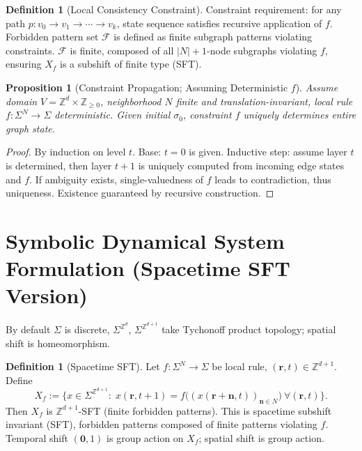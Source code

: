 \documentclass[11pt]{article}
\newtheorem{proposition}[theorem]{Proposition}
\theoremstyle{definition}
\newtheorem{definition}[theorem]{Definition}
\theoremstyle{remark}
\begin{document}
\begin{definition}[Local Consistency Constraint]\label{def:consistency}
Constraint requirement: for any path \( p: v_0 \to v_1 \to \cdots \to v_k \), state sequence satisfies recursive application of \( f \). Forbidden pattern set \( \mathcal{F} \) is defined as finite subgraph patterns violating constraints. \( \mathcal{F} \) is finite, composed of all \( |N|+1 \)-node subgraphs violating \( f \), ensuring \( X_f \) is a subshift of finite type (SFT).
\end{definition}

\begin{proposition}[Constraint Propagation; Assuming Deterministic \( f \)]\label{prop:propagation}
Assume domain \( V=\mathbb Z^d\times\mathbb Z_{\ge0} \), neighborhood \( N \) finite and translation-invariant, local rule \( f:\Sigma^{N}\to\Sigma \) deterministic. Given initial \( \sigma_0 \), constraint \( f \) uniquely determines entire graph state.
\end{proposition}

\begin{proof}
By induction on level \( t \). Base: \( t=0 \) is given. Inductive step: assume layer \( t \) is determined, then layer \( t+1 \) is uniquely computed from incoming edge states and \( f \). If ambiguity exists, single-valuedness of \( f \) leads to contradiction, thus uniqueness. Existence guaranteed by recursive construction.
\end{proof}

\section{Symbolic Dynamical System Formulation (Spacetime SFT Version)}\label{sec:symbolic}

By default \( \Sigma \) is discrete, \( \Sigma^{\mathbb Z^d} \), \( \Sigma^{\mathbb Z^{d+1}} \) take Tychonoff product topology; spatial shift is homeomorphism.

\begin{definition}[Spacetime SFT]\label{def:sft}
Let \( f:\Sigma^{N}\to \Sigma \) be local rule, \( (\mathbf r,t)\in\mathbb Z^{d+1} \). Define
\[
X_f :=\Big\{x\in \Sigma^{\mathbb Z^{d+1}}: \;
x(\mathbf r,t+1)=f\big((x(\mathbf r+\mathbf n,t))_{\mathbf n\in N}\big)\ \forall (\mathbf r,t)\Big\}.
\]
Then \( X_f \) is \( \mathbb Z^{d+1} \)-SFT (finite forbidden patterns). This is spacetime subshift invariant (SFT), forbidden patterns composed of finite patterns violating \( f \). Temporal shift \( (\mathbf 0,1) \) is group action on \( X_f \); spatial shift is group action.
\end{definition}
\end{document}
